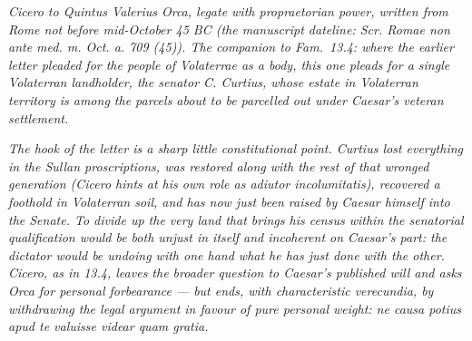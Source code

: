 
\textit{Cicero to Quintus Valerius Orca, legate with
propraetorian power, written from Rome not before
mid-October 45 BC (the manuscript dateline: \textit{Scr.
Romae non ante med. m. Oct. a. 709 (45)}). The companion
to Fam.\ 13.4: where the earlier letter pleaded for the
people of Volaterrae as a body, this one pleads for a
single Volaterran landholder, the senator C. Curtius,
whose estate in Volaterran territory is among the parcels
about to be parcelled out under Caesar's veteran
settlement.}

\textit{The hook of the letter is a sharp little
constitutional point. Curtius lost everything in the
Sullan proscriptions, was restored along with the rest of
that wronged generation (Cicero hints at his own role as
\textit{adiutor incolumitatis}), recovered a foothold in
Volaterran soil, and has now just been raised by Caesar
himself into the Senate. To divide up the very land that
brings his census within the senatorial qualification
would be both unjust in itself and incoherent on Caesar's
part: the dictator would be undoing with one hand what he
has just done with the other. Cicero, as in 13.4, leaves
the broader question to Caesar's published will and asks
Orca for personal forbearance --- but ends, with
characteristic verecundia, by withdrawing the legal
argument in favour of pure personal weight: \textit{ne
causa potius apud te valuisse videar quam gratia}.}
